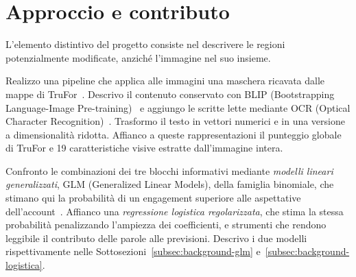 \section{Approccio e contributo}
\label{sec:introduzione-approccio}

L'elemento distintivo del progetto consiste nel descrivere le regioni potenzialmente modificate, anziché l'immagine nel suo insieme.

Realizzo una pipeline che applica alle immagini una maschera ricavata dalle mappe di TruFor~\cite{Guillaro_2023_CVPR}. Descrivo il contenuto conservato con BLIP (Bootstrapping Language-Image Pre-training)~\cite{pmlr-v162-li22n} e aggiungo le scritte lette mediante OCR (Optical Character Recognition)~\cite{easyocr_software}. Trasformo il testo in vettori numerici e in una versione a dimensionalità ridotta. Affianco a queste rappresentazioni il punteggio globale di TruFor e 19 caratteristiche visive estratte dall'immagine intera.

Confronto le combinazioni dei tre blocchi informativi mediante \emph{modelli lineari generalizzati}, GLM (Generalized Linear Models), della famiglia binomiale, che stimano qui la probabilità di un engagement superiore alle aspettative dell'account~\cite{68aee965-a8a0-3e72-9f89-8d89ae91a62b}. Affianco una \emph{regressione logistica regolarizzata}, che stima la stessa probabilità penalizzando l'ampiezza dei coefficienti, e strumenti che rendono leggibile il contributo delle parole alle previsioni. Descrivo i due modelli rispettivamente nelle Sottosezioni~\ref{subsec:background-glm} e~\ref{subsec:background-logistica}.


